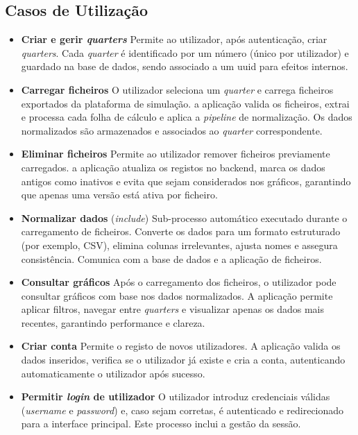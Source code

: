 \subsection{Casos de Utilização}
\begin{itemize}
    \item \textbf{Criar e gerir \textit{quarters}}
    Permite ao utilizador, após autenticação, criar \textit{quarters}. Cada \textit{quarter} é identificado por um número (único por utilizador) e guardado na base de dados, sendo associado a um \gls{uuid} para efeitos internos.

    \item \textbf{Carregar ficheiros} O utilizador seleciona um \textit{quarter} e carrega ficheiros exportados da plataforma de simulação. a aplicação valida os ficheiros, extrai e processa cada folha de cálculo e aplica a \textit{pipeline} de normalização. Os dados normalizados são armazenados e associados ao \textit{quarter} correspondente.

    \item \textbf{Eliminar ficheiros} Permite ao utilizador remover ficheiros previamente carregados. a aplicação atualiza os registos no backend, marca os dados antigos como inativos e evita que sejam considerados nos gráficos, garantindo que apenas uma versão está ativa por ficheiro.

    \item \textbf{Normalizar dados} (\textit{include}) Sub-processo automático executado durante o carregamento de ficheiros. Converte os dados para um formato estruturado (por exemplo, CSV), elimina colunas irrelevantes, ajusta nomes e assegura consistência. Comunica com a base de dados e a aplicação de ficheiros.

    \item \textbf{Consultar gráficos} Após o carregamento dos ficheiros, o utilizador pode consultar gráficos com base nos dados normalizados. A aplicação permite aplicar filtros, navegar entre \textit{quarters} e visualizar apenas os dados mais recentes, garantindo performance e clareza.

    \item \textbf{Criar conta} Permite o registo de novos utilizadores. A aplicação valida os dados inseridos, verifica se o utilizador já existe e cria a conta, autenticando automaticamente o utilizador após sucesso.

    \item \textbf{Permitir \textit{login} de utilizador} O utilizador introduz credenciais válidas (\textit{username} e \textit{password}) e, caso sejam corretas, é autenticado e redirecionado para a interface principal. Este processo inclui a gestão da sessão.

\end{itemize}

